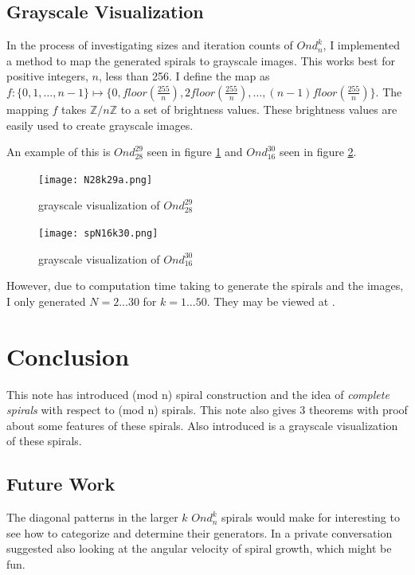 \documentclass[11pt]{amsart}
\theoremstyle{mydef}
\begin{document}
\subsection{Grayscale Visualization}

In the process of investigating sizes and iteration counts of $Ond^k_n$, I implemented a method to map the generated spirals to grayscale images. This works best for positive integers, $n$, less than 256. I define the map as $f : \{ 0, 1, \ldots, n-1 \} \mapsto \{ 0, floor(\frac{255}{n}), 2floor(\frac{255}{n}), \ldots, (n-1)floor(\frac{255}{n}) \}$. The mapping $f$ takes $\mathbb{Z}/n\mathbb{Z}$ to a set of brightness values. These brightness values are easily used to create grayscale images.

An example of this is $Ond^{29}_{28}$ seen in figure \ref{fig:viz2928} and $Ond^{30}_{16}$ seen in figure \ref{fig:viz1630}.

\begin{figure}[h]
\centering
\texttt{[image: N28k29a.png]}
\caption{grayscale visualization of $Ond^{29}_{28}$}
\label{fig:viz2928}
\end{figure}

\begin{figure}
\centering
\texttt{[image: spN16k30.png]}
\caption{grayscale visualization of $Ond^{30}_{16}$}
\label{fig:viz1630}
\end{figure}

However, due to computation time taking to generate the spirals and the images, I only generated $N=2...30$ for $k=1...50$. They may be viewed at \cite{GraySquare}.

\section{Conclusion}
This note has introduced (mod n) spiral construction and the idea of \textit{complete spirals} with respect to (mod n) spirals. This note also gives 3 theorems with proof about some features of these spirals. Also introduced is a grayscale visualization of these spirals. 

\subsection{Future Work}
The diagonal patterns in the larger $k$ $Ond^k_n$ spirals would make for interesting to see how to categorize and determine their generators. In a private conversation \cite{Kusner} suggested also looking at the angular velocity of spiral growth, which might be fun.
\end{document}
